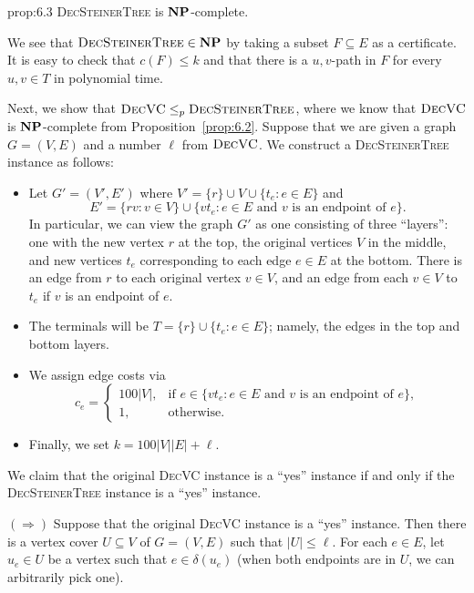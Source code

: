 \begin{prop}{prop:6.3}
    \textsc{DecSteinerTree} is $\mathbf{NP}$-complete.
\end{prop}\vspace{-0.25cm}
\begin{pf}
    We see that $\textsc{DecSteinerTree} \in \mathbf{NP}$ by taking a subset 
    $F \subseteq E$ as a certificate. It is easy to check that $c(F) \leq k$
    and that there is a $u, v$-path in $F$ for every $u, v \in T$ in 
    polynomial time. 

    Next, we show that $\textsc{DecVC} \leq_p \textsc{DecSteinerTree}$, 
    where we know that $\textsc{DecVC}$ is $\mathbf{NP}$-complete from 
    Proposition~\ref{prop:6.2}. Suppose that we are given a graph 
    $G = (V, E)$ and a number $\ell$ from $\textsc{DecVC}$. We 
    construct a \textsc{DecSteinerTree} instance as follows: 
    \begin{itemize}
        \item Let $G' = (V', E')$ where $V' = \{r\} \cup V \cup \{t_e : 
        e \in E\}$ and 
        \[ E' = \{rv : v \in V\} \cup \{vt_e : e \in E \text{ and $v$ 
        is an endpoint of $e$}\}. \]
        In particular, we can view the graph $G'$ as one consisting of three 
        ``layers'': one with the new vertex $r$ at the top, the original 
        vertices $V$ in the middle, and new vertices $t_e$ corresponding to 
        each edge $e \in E$ at the bottom. There is an edge from $r$ to 
        each original vertex $v \in V$, and an edge from each $v \in V$ 
        to $t_e$ if $v$ is an endpoint of $e$. 
        \item The terminals will be $T = \{r\} \cup \{t_e : e \in E\}$; namely, 
        the edges in the top and bottom layers.
        \item We assign edge costs via 
        \[ c_e = \begin{cases}
            100|V|, & \text{if } e \in \{vt_e : e \in E \text{ and $v$ 
            is an endpoint of $e$}\}, \\ 
            1, & \text{otherwise.}
        \end{cases} \]
        \item Finally, we set $k = 100|V||E| + \ell$.
    \end{itemize}
    We claim that the original \textsc{DecVC} instance is a ``yes'' instance 
    if and only if the \textsc{DecSteinerTree} instance is a 
    ``yes'' instance. 

    $(\Rightarrow)$ Suppose that the original \textsc{DecVC} instance is a 
    ``yes'' instance. Then there is a vertex cover $U \subseteq V$ 
    of $G = (V, E)$ such that $|U| \leq \ell$. For each $e \in E$, let 
    $u_e \in U$ be a vertex such that $e \in \delta(u_e)$ (when both 
    endpoints are in $U$, we can arbitrarily pick one).


\end{pf}
